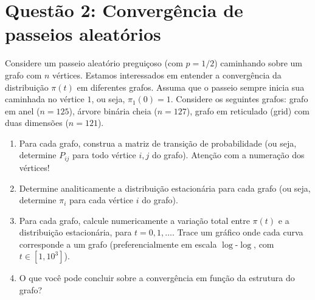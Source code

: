 \section*{Questão 2: Convergência de passeios aleatórios}
Considere um passeio aleatório preguiçoso (com $p = 1/2$) caminhando sobre um grafo com $n$ vértices. Estamos interessados em entender a convergência da distribuição $\pi(t)$ em diferentes grafos. Assuma que o passeio sempre inicia sua caminhada no vértice $1$, ou seja, $\pi_1(0) = 1$. Considere os seguintes grafos: grafo em anel ($n = 125$), árvore binária cheia ($n = 127$), grafo em reticulado (grid) com duas dimensões ($n = 121$).

\begin{enumerate}
    \item Para cada grafo, construa a matriz de transição de probabilidade (ou seja, determine $P_{ij}$ para todo vértice $i, j$ do grafo). Atenção com a numeração dos vértices!
    \item Determine analiticamente a distribuição estacionária para cada grafo (ou seja, determine $\pi_i$ para cada vértice $i$ do grafo).
    \item Para cada grafo, calcule numericamente a variação total entre $\pi(t)$ e a distribuição estacionária, para $t = 0, 1, \dots$. Trace um gráfico onde cada curva corresponde a um grafo (preferencialmente em escala $\log$-$\log$, com $t \in [1, 10^3]$).
    \item O que você pode concluir sobre a convergência em função da estrutura do grafo?
\end{enumerate}

